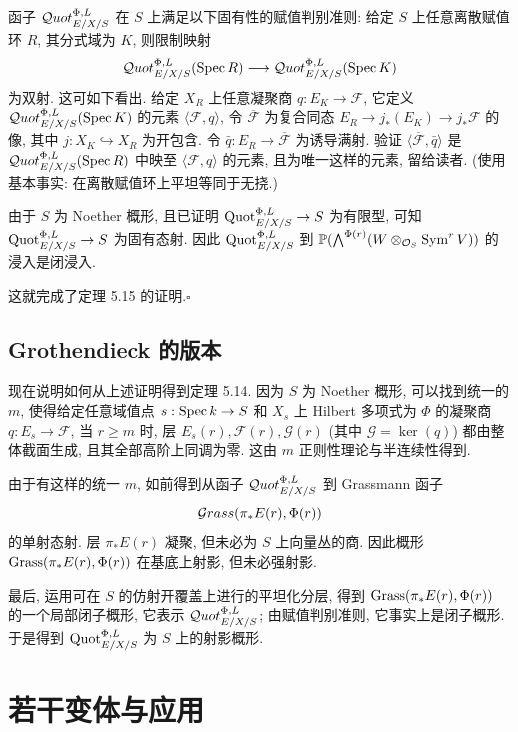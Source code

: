 函子 $\mathcal{Q}uot^{\Phi,L}_{E/X/S}$ 在 $S$ 上满足以下固有性的赋值判别准则: 给定 $S$ 上任意离散赋值环 $R$, 其分式域为 $K$, 则限制映射
\[
 \mathcal{Q}uot^{\Phi,L}_{E/X/S}(\operatorname{Spec} R)\longrightarrow\mathcal{Q}uot^{\Phi,L}_{E/X/S}(\operatorname{Spec} K)
\]
为双射. 这可如下看出. 给定 $X_R$ 上任意凝聚商 $q:E_K\to\mathcal F$, 它定义 $\mathcal{Q}uot^{\Phi,L}_{E/X/S}(\operatorname{Spec} K)$ 的元素 $\langle\mathcal F,q\rangle$, 令 $\overline{\mathcal F}$ 为复合同态 $E_R\to j_*(E_K)\to j_*\mathcal F$ 的像, 其中 $j:X_K\hookrightarrow X_R$ 为开包含. 令 $\bar q:E_R\to\overline{\mathcal F}$ 为诱导满射. 验证 $\langle\overline{\mathcal F},\bar q\rangle$ 是 $\mathcal{Q}uot^{\Phi,L}_{E/X/S}(\operatorname{Spec} R)$ 中映至 $\langle\mathcal F,q\rangle$ 的元素, 且为唯一这样的元素, 留给读者. (使用基本事实: 在离散赋值环上平坦等同于无挠.)

由于 $S$ 为 Noether 概形, 且已证明 $\operatorname{Quot}^{\Phi,L}_{E/X/S}\to S$ 为有限型, 可知 $\operatorname{Quot}^{\Phi,L}_{E/X/S}\to S$ 为固有态射. 因此 $\operatorname{Quot}^{\Phi,L}_{E/X/S}$ 到 $\mathbb P(\bigwedge^{\Phi(r)}(W\otimes_{\mathcal O_S}\operatorname{Sym}^rV))$ 的浸入是闭浸入.

这就完成了定理 5.15 的证明.\hfill$\square$

\subsection{Grothendieck 的版本}\label{ch05:sec5.5.8}
现在说明如何从上述证明得到定理 5.14. 因为 $S$ 为 Noether 概形, 可以找到统一的 $m$, 使得给定任意域值点 $s:\operatorname{Spec} k\to S$ 和 $X_s$ 上 Hilbert 多项式为 $\Phi$ 的凝聚商 $q:E_s\to\mathcal F$, 当 $r\geq m$ 时, 层 $E_s(r),\mathcal F(r),\mathcal G(r)$ (其中 $\mathcal G=\ker(q)$) 都由整体截面生成, 且其全部高阶上同调为零. 这由 $m$ 正则性理论与半连续性得到.

由于有这样的统一 $m$, 如前得到从函子 $\mathcal{Q}uot^{\Phi,L}_{E/X/S}$ 到 Grassmann 函子
\[
 \mathcal{G}rass(\pi_*E(r),\Phi(r))
\]
的单射态射. 层 $\pi_*E(r)$ 凝聚, 但未必为 $S$ 上向量丛的商. 因此概形 $\operatorname{Grass}(\pi_*E(r),\Phi(r))$ 在基底上射影, 但未必强射影.

最后, 运用可在 $S$ 的仿射开覆盖上进行的平坦化分层, 得到 $\operatorname{Grass}(\pi_*E(r),\Phi(r))$ 的一个局部闭子概形, 它表示 $\mathcal{Q}uot^{\Phi,L}_{E/X/S}$; 由赋值判别准则, 它事实上是闭子概形. 于是得到 $\operatorname{Quot}^{\Phi,L}_{E/X/S}$ 为 $S$ 上的射影概形.
\section{若干变体与应用}\label{ch05:sec5.6}
